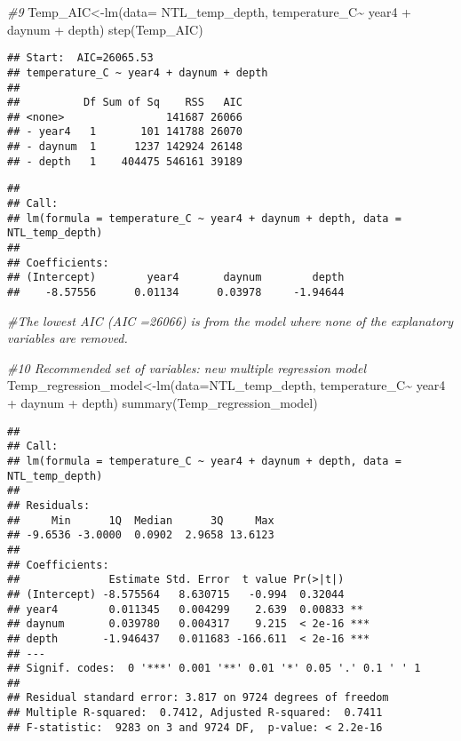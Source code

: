 \documentclass[
]{article}
\newenvironment{Shaded}{\begin{snugshade}}{\end{snugshade}}
\newcommand{\AttributeTok}[1]{\textcolor[rgb]{0.77,0.63,0.00}{#1}}
\newcommand{\CommentTok}[1]{\textcolor[rgb]{0.56,0.35,0.01}{\textit{#1}}}
\newcommand{\FunctionTok}[1]{\textcolor[rgb]{0.00,0.00,0.00}{#1}}
\newcommand{\NormalTok}[1]{#1}
\newcommand{\OtherTok}[1]{\textcolor[rgb]{0.56,0.35,0.01}{#1}}
\newcommand{\SpecialCharTok}[1]{\textcolor[rgb]{0.00,0.00,0.00}{#1}}
\begin{document}
\begin{Shaded}
\begin{Highlighting}[]
\CommentTok{\#9 }
\NormalTok{Temp\_AIC}\OtherTok{\textless{}{-}}\FunctionTok{lm}\NormalTok{(}\AttributeTok{data=}\NormalTok{ NTL\_temp\_depth, temperature\_C}\SpecialCharTok{\textasciitilde{}}\NormalTok{ year4 }\SpecialCharTok{+}\NormalTok{ daynum }\SpecialCharTok{+}\NormalTok{ depth)}
\FunctionTok{step}\NormalTok{(Temp\_AIC)}
\end{Highlighting}
\end{Shaded}

\begin{verbatim}
## Start:  AIC=26065.53
## temperature_C ~ year4 + daynum + depth
## 
##          Df Sum of Sq    RSS   AIC
## <none>                141687 26066
## - year4   1       101 141788 26070
## - daynum  1      1237 142924 26148
## - depth   1    404475 546161 39189
\end{verbatim}

\begin{verbatim}
## 
## Call:
## lm(formula = temperature_C ~ year4 + daynum + depth, data = NTL_temp_depth)
## 
## Coefficients:
## (Intercept)        year4       daynum        depth  
##    -8.57556      0.01134      0.03978     -1.94644
\end{verbatim}

\begin{Shaded}
\begin{Highlighting}[]
\CommentTok{\#The lowest AIC (AIC =26066) is from the model where none of the explanatory variables are removed.}

\CommentTok{\#10 Recommended set of variables: new multiple regression model}
\NormalTok{Temp\_regression\_model}\OtherTok{\textless{}{-}}\FunctionTok{lm}\NormalTok{(}\AttributeTok{data=}\NormalTok{NTL\_temp\_depth, temperature\_C}\SpecialCharTok{\textasciitilde{}}\NormalTok{ year4 }\SpecialCharTok{+}\NormalTok{ daynum }\SpecialCharTok{+}\NormalTok{ depth)}
\FunctionTok{summary}\NormalTok{(Temp\_regression\_model)}
\end{Highlighting}
\end{Shaded}

\begin{verbatim}
## 
## Call:
## lm(formula = temperature_C ~ year4 + daynum + depth, data = NTL_temp_depth)
## 
## Residuals:
##     Min      1Q  Median      3Q     Max 
## -9.6536 -3.0000  0.0902  2.9658 13.6123 
## 
## Coefficients:
##              Estimate Std. Error  t value Pr(>|t|)    
## (Intercept) -8.575564   8.630715   -0.994  0.32044    
## year4        0.011345   0.004299    2.639  0.00833 ** 
## daynum       0.039780   0.004317    9.215  < 2e-16 ***
## depth       -1.946437   0.011683 -166.611  < 2e-16 ***
## ---
## Signif. codes:  0 '***' 0.001 '**' 0.01 '*' 0.05 '.' 0.1 ' ' 1
## 
## Residual standard error: 3.817 on 9724 degrees of freedom
## Multiple R-squared:  0.7412, Adjusted R-squared:  0.7411 
## F-statistic:  9283 on 3 and 9724 DF,  p-value: < 2.2e-16
\end{verbatim}
\end{document}
